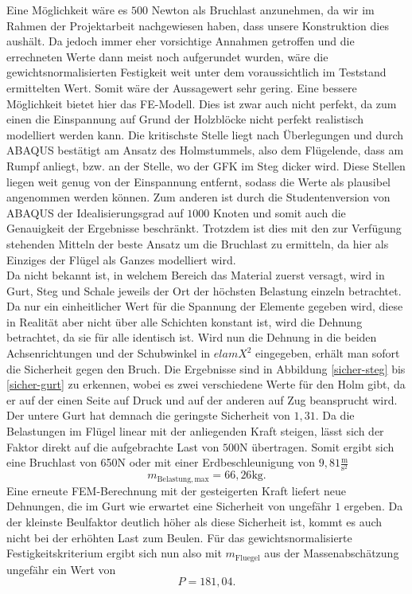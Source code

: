 \noindent Eine Möglichkeit wäre es $500$ Newton als Bruchlast anzunehmen, da wir im Rahmen der Projektarbeit nachgewiesen haben, dass unsere Konstruktion dies aushält. Da jedoch immer eher vorsichtige Annahmen getroffen und die errechneten Werte dann meist noch aufgerundet wurden, wäre die gewichtsnormalisierten Festigkeit weit unter dem voraussichtlich im Teststand ermittelten Wert. Somit wäre der Aussagewert sehr gering.
Eine bessere Möglichkeit bietet hier das FE-Modell. Dies ist zwar auch nicht perfekt, da zum einen die Einspannung auf Grund der Holzblöcke nicht perfekt realistisch modelliert werden kann. Die kritischste Stelle liegt nach Überlegungen und durch ABAQUS bestätigt am Ansatz des Holmstummels, also dem Flügelende, dass am Rumpf anliegt, bzw. an der Stelle, wo der GFK im Steg dicker wird. Diese Stellen liegen weit genug von der Einspannung entfernt, sodass die Werte als plausibel angenommen werden können. Zum anderen ist durch die Studentenversion von ABAQUS der Idealisierungsgrad auf $1000$ Knoten und somit auch die Genauigkeit der Ergebnisse beschränkt. Trotzdem ist dies mit den zur Verfügung stehenden Mitteln der beste Ansatz um die Bruchlast zu ermitteln, da hier als Einziges der Flügel als Ganzes modelliert wird.\\
\noindent 
Da nicht bekannt ist, in welchem Bereich das Material zuerst versagt, wird in Gurt, Steg und Schale jeweils der Ort der höchsten Belastung einzeln betrachtet. Da nur ein einheitlicher Wert für die Spannung der Elemente gegeben wird, diese in Realität aber nicht über alle Schichten konstant ist, wird die Dehnung betrachtet, da sie für alle identisch ist. Wird nun die Dehnung in die beiden Achsenrichtungen und der Schubwinkel in $elamX^{2}$ eingegeben, erhält man sofort die Sicherheit gegen den Bruch. Die Ergebnisse sind in Abbildung \ref{sicher-steg} bis \ref{sicher-gurt} zu erkennen, wobei es zwei verschiedene Werte für den Holm gibt, da er auf der einen Seite auf Druck und auf der anderen auf Zug beansprucht wird. Der untere Gurt hat demnach die geringste Sicherheit von $1,31$. Da die Belastungen im Flügel linear mit der anliegenden Kraft steigen, lässt sich der Faktor direkt auf die aufgebrachte Last von $500\mathrm{N}$ übertragen. Somit ergibt sich eine Bruchlast von 650N oder mit einer Erdbeschleunigung von $9,81\frac{\mathrm{m}}{\mathrm{s^2}}$
$$m_{\mathrm{Belastung,max}} = 66,26\mathrm{kg}. $$ Eine erneute FEM-Berechnung mit der gesteigerten Kraft liefert neue Dehnungen, die im Gurt wie erwartet eine Sicherheit von ungefähr $1$ ergeben. Da der kleinste Beulfaktor deutlich höher als diese Sicherheit ist, kommt es auch nicht bei der erhöhten Last zum Beulen.
Für das gewichtsnormalisierte Festigkeitskriterium ergibt sich nun also mit $m_{\mathrm{Fluegel}}$ aus der Massenabschätzung ungefähr ein Wert von
$$P = 181,04.$$
